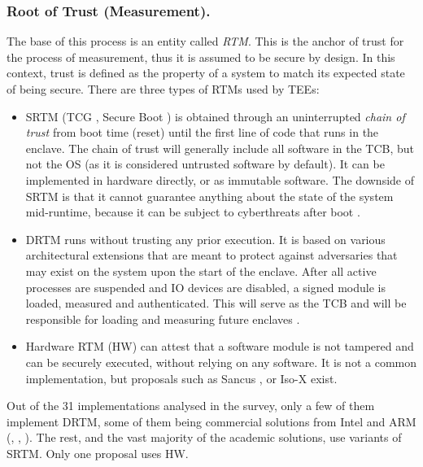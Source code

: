 \documentclass[runningheads,a4paper]{uwsese}
\begin{document}
\subsubsection{Root of Trust (Measurement).}
\label{rot}

The base of this process is an entity called \emph{\gls{RTM}}. This is the
anchor of trust for the process of measurement, thus it is assumed to be secure
by design. In this context, trust is defined as the property of a system to
match its expected state of being secure. There are three types of \glspl{RTM}
used by \glspl{TEE}:

\begin{itemize}
    \item \gls{SRTM} (TCG \cite{tee_tcg_arch_overview}, Secure Boot
        \cite{windows-driver-content2023Dec}) is obtained through an
        uninterrupted \emph{chain of trust} from boot time (reset) until the
        first line of code that runs in the enclave. The chain of trust will
        generally include all software in the \gls{TCB}, but not the OS (as it
        is considered untrusted software by default). It can be implemented in
        hardware directly, or as immutable software. The downside of \gls{SRTM}
        is that it cannot guarantee anything about the state of the system
        mid-runtime, because it can be subject to cyberthreats after boot
        \cite{tee_smart_rot} \cite{tee_hw_sup}.
    \item \gls{DRTM} runs without trusting any prior execution. It is based
        on various architectural extensions that are meant to protect against
        adversaries that may exist on the system upon the start of the enclave.
        After all active processes are suspended and IO devices are disabled, a
        signed module is loaded, measured and authenticated. This will serve as
        the \gls{TCB} and will be responsible for loading and measuring future
        enclaves \cite{tee_hw_sup}.
    \item Hardware RTM (HW) can attest that a software module is not tampered
        and can be securely executed, without relying on any software. It is
        not a common implementation, but proposals such as Sancus
        \cite{tee_sancus}, or Iso-X \cite{tee_isox} exist. 
\end{itemize}

Out of the 31 implementations analysed in the survey, only a few of them
implement \gls{DRTM}, some of them being commercial solutions from Intel and
ARM (\cite{arm_tz}, \cite{intel_tdx}, \cite{intel_sgx}). The rest, and the vast
majority of the academic solutions, use variants of \gls{SRTM}. Only one
proposal uses HW.
\end{document}
